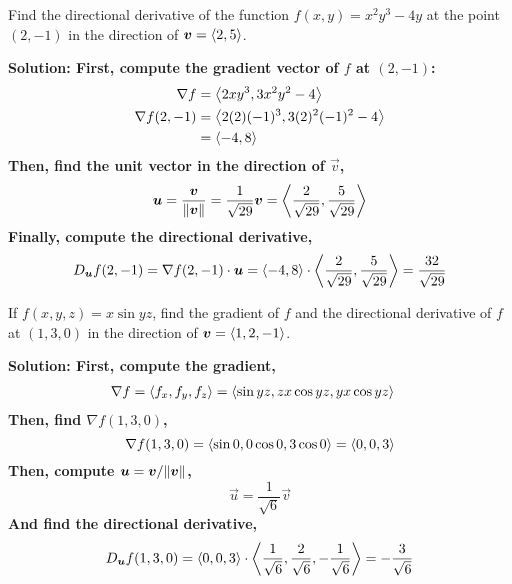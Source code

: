 \begin{example}
    Find the directional derivative of the function \(f(x,y) = x^2y^3-4y\) at the point \((2, -1)\) in the direction of \(\boldsymbol{v} = \left\langle2, 5\right\rangle\).\par\bf{Solution: }First, compute the gradient vector of \(f\) at \((2, -1)\):
    \begin{align*}
        \nabla f &= \left\langle2xy^3, 3x^2y^2-4\right\rangle \\
        \nabla f(2, -1) &= \left\langle2(2)(-1)^3, 3(2)^2(-1)^2-4\right\rangle \\
        &= \left\langle -4, 8\right\rangle
    \end{align*}
    Then, find the unit vector in the direction of \(\vec v\),
    \[ \boldsymbol{u} =\frac{\boldsymbol{v}}{\norm{\boldsymbol{v}}} = \frac{1}{\sqrt{29}}\boldsymbol{v} = \left\langle\frac{2}{\sqrt{29}}, \frac{5}{\sqrt{29}}\right\rangle\]
    Finally, compute the directional derivative,
    \begin{align*}
        D_{\boldsymbol{u}}f(2, -1) = \nabla f(2, -1)\cdot \boldsymbol{u} = \left\langle-4, 8\right\rangle\cdot \left\langle\frac{2}{\sqrt{29}}, \frac{5}{\sqrt{29}}\right\rangle = \frac{32}{\sqrt{29}}
    \end{align*}
\end{example}
\begin{example}
    If \(f(x,y,z)=x\sin yz\), find the gradient of \(f\) and the directional derivative of \(f\) at \((1,3,0)\) in the direction of \(\boldsymbol{v} = \left\langle1, 2, -1\right\rangle\).\par\bf{Solution: }First, compute the gradient,
    \begin{align*}
        \nabla f = \left\langle f_x, f_y, f_z\right\rangle &= \left\langle\sin yz, zx\cos yz, yx\cos yz\right\rangle
    \end{align*}
    Then, find \(\nabla f(1,3,0)\),
    \[ \nabla f(1,3,0) = \left\langle\sin 0, 0\cos 0, 3\cos 0\right\rangle = \left\langle0, 0, 3\right\rangle\]
    Then, compute \(\boldsymbol{u} = \boldsymbol{v}/\norm{\boldsymbol{v}}\),
    \[ \vec u = \frac{1}{\sqrt 6}\vec v \]
    And find the directional derivative,
    \[ D_{\boldsymbol{u}}f(1,3, 0) = \left\langle0, 0, 3\right\rangle \cdot \left\langle\frac{1}{\sqrt 6}, \frac{2}{\sqrt 6}, -\frac{1}{\sqrt 6}\right\rangle = -\frac{3}{\sqrt 6}\]
\end{example}
